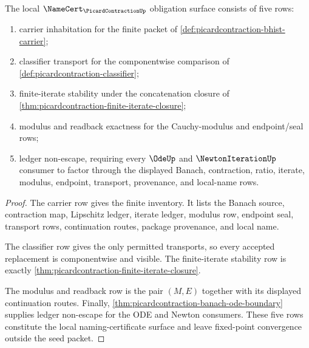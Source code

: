 \begin{theorem}
\label{thm:picardcontraction-namecert-obligation-surface}
The local $\NameCert_{\PicardContractionUp}$ obligation surface consists of
five rows:
\begin{enumerate}
\item carrier inhabitation for the finite packet of
\autoref{def:picardcontraction-bhist-carrier};
\item classifier transport for the componentwise comparison of
\autoref{def:picardcontraction-classifier};
\item finite-iterate stability under the concatenation closure of
\autoref{thm:picardcontraction-finite-iterate-closure};
\item modulus and readback exactness for the Cauchy-modulus and endpoint/seal
rows;
\item ledger non-escape, requiring every $\OdeUp$ and $\NewtonIterationUp$
consumer to factor through the displayed Banach, contraction, ratio, iterate,
modulus, endpoint, transport, provenance, and local-name rows.
\end{enumerate}
\end{theorem}
\begin{proof}
The carrier row gives the finite inventory. It lists the Banach source,
contraction map, Lipschitz ledger, iterate ledger, modulus row, endpoint seal,
transport rows, continuation routes, package provenance, and local name.

The classifier row gives the only permitted transports, so every accepted
replacement is componentwise and visible. The finite-iterate stability row is
exactly \autoref{thm:picardcontraction-finite-iterate-closure}.

The modulus and readback row is the pair $(M,E)$ together with its displayed
continuation routes. Finally,
\autoref{thm:picardcontraction-banach-ode-boundary} supplies ledger
non-escape for the ODE and Newton consumers. These five rows constitute the
local naming-certificate surface and leave fixed-point convergence outside
the seed packet.
\end{proof}

